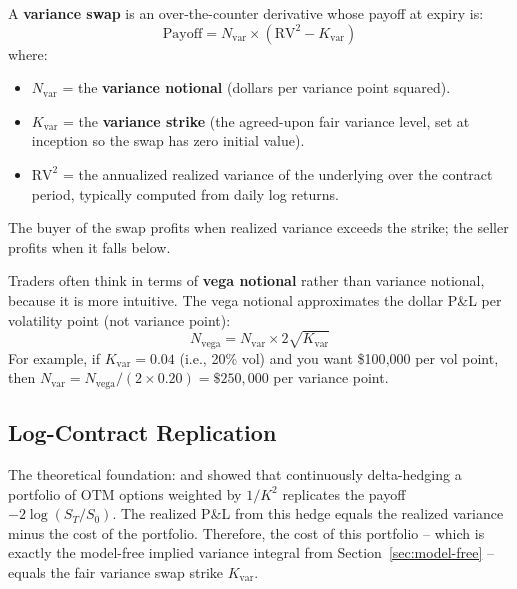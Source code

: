 \begin{definition}
A \textbf{variance swap} is an over-the-counter derivative whose payoff at expiry is:
\begin{equation}
  \text{Payoff} = N_{\text{var}} \times (\text{RV}^2 - K_{\text{var}})
  \label{eq:varswap-payoff}
\end{equation}
where:
\begin{itemize}[nosep]
  \item $N_{\text{var}}$ = the \textbf{variance notional} (dollars per variance point squared).
  \item $K_{\text{var}}$ = the \textbf{variance strike} (the agreed-upon fair variance level, set at inception so the swap has zero initial value).
  \item $\text{RV}^2$ = the annualized realized variance of the underlying over the contract period, typically computed from daily log returns.
\end{itemize}
The buyer of the swap profits when realized variance exceeds the strike; the seller profits when it falls below.
\end{definition}

Traders often think in terms of \textbf{vega notional} rather than variance notional, because it is more intuitive.
The vega notional approximates the dollar P\&L per volatility point (not variance point):
\begin{equation}
  N_{\text{vega}} = N_{\text{var}} \times 2\sqrt{K_{\text{var}}}
  \label{eq:vega-notional}
\end{equation}
For example, if $K_{\text{var}} = 0.04$ (i.e., 20\% vol) and you want \$100{,}000 per vol point, then $N_{\text{var}} = N_{\text{vega}} / (2 \times 0.20) = \$250{,}000$ per variance point.

\subsection{Log-Contract Replication}

The theoretical foundation: \citet{BrittenJones2000} and \citet{Carr2009} showed that continuously delta-hedging a portfolio of OTM options weighted by $1/K^2$ replicates the payoff $-2\log(S_T/S_0)$.
The realized P\&L from this hedge equals the realized variance minus the cost of the portfolio.
Therefore, the cost of this portfolio -- which is exactly the model-free implied variance integral from Section~\ref{sec:model-free} -- equals the fair variance swap strike $K_{\text{var}}$.

